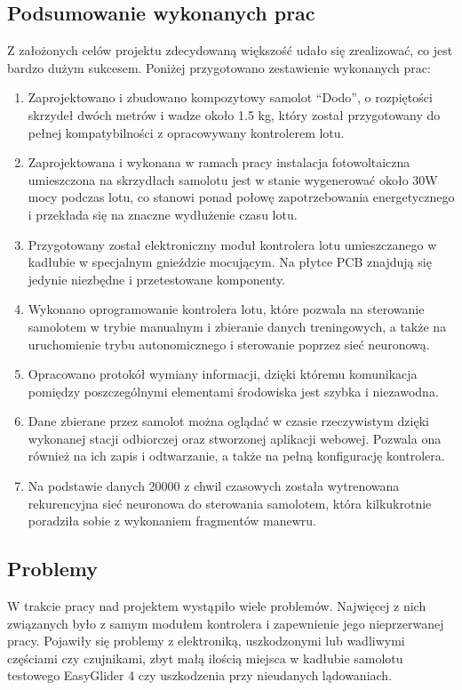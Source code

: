 \documentclass[12pt, a4paper]{article}
\begin{document}
\subsection{Podsumowanie wykonanych prac}
Z założonych celów projektu zdecydowaną większość udało się zrealizować, co jest bardzo dużym sukcesem. Poniżej przygotowano zestawienie wykonanych prac:
\begin{enumerate}
\item Zaprojektowano i zbudowano kompozytowy samolot ``Dodo'', o rozpiętości skrzydeł dwóch metrów i wadze około 1.5 kg, który został przygotowany do pełnej kompatybilności z opracowywany kontrolerem lotu. 
\item Zaprojektowana i wykonana w ramach pracy instalacja fotowoltaiczna umieszczona na skrzydłach samolotu jest w stanie wygenerować około 30W mocy podczas lotu, co stanowi ponad połowę zapotrzebowania energetycznego i przekłada się na znaczne wydłużenie czasu lotu.
\item Przygotowany został elektroniczny moduł kontrolera lotu umieszczanego w kadłubie w specjalnym gnieździe mocującym. Na płytce PCB znajdują się jedynie niezbędne i przetestowane komponenty.
\item Wykonano oprogramowanie kontrolera lotu, które pozwala na sterowanie samolotem w trybie manualnym i zbieranie danych treningowych, a także na uruchomienie trybu autonomicznego i sterowanie poprzez sieć neuronową.
\item Opracowano protokół wymiany informacji, dzięki któremu komunikacja pomiędzy poszczególnymi elementami środowiska jest szybka i niezawodna.
\item Dane zbierane przez samolot można oglądać w czasie rzeczywistym dzięki wykonanej stacji odbiorczej oraz stworzonej aplikacji webowej. Pozwala ona również na ich zapis i odtwarzanie, a także na pełną konfigurację kontrolera.
\item Na podstawie danych 20000 z chwil czasowych została wytrenowana rekurencyjna sieć neuronowa do sterowania samolotem, która kilkukrotnie poradziła sobie z wykonaniem fragmentów manewru.

\end{enumerate}

\subsection{Problemy}
W trakcie pracy nad projektem wystąpiło wiele problemów. Najwięcej z nich związanych było z samym modułem kontrolera i zapewnienie jego nieprzerwanej pracy. Pojawiły się problemy z elektroniką, uszkodzonymi lub wadliwymi częściami czy czujnikami, zbyt małą ilością miejsca w kadłubie samolotu testowego EasyGlider 4 czy uszkodzenia przy nieudanych lądowaniach. 
\end{document}

